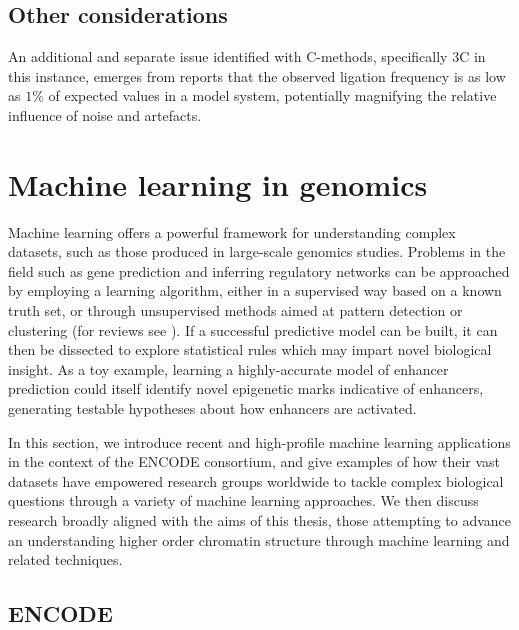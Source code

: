 \documentclass[a4paper,11pt,oneside]{book}
\begin{document}
\subsection{Other considerations}
An additional and separate issue identified with C-methods, specifically 3C in this instance, emerges from reports that the observed ligation frequency is as low as $1\%$ of expected values in a model system,\cite{Gavrilov2013} potentially magnifying the relative influence of noise and artefacts.



\section{Machine learning in genomics}\label{intro:ml}

Machine learning offers a powerful framework for understanding complex datasets, such as those produced in large-scale genomics studies. Problems in the field such as gene prediction and inferring regulatory networks can be approached by employing a learning algorithm, either in a supervised way based on a known truth set, or through unsupervised methods aimed at pattern detection or clustering (for reviews see ). If a successful predictive model can be built, it can then be dissected to explore statistical rules which may impart novel biological insight. As a toy example, learning a highly-accurate model of enhancer prediction could itself identify novel epigenetic marks indicative of enhancers, generating testable hypotheses about how enhancers are activated.

In this section, we introduce recent and high-profile machine learning applications in the context of the ENCODE consortium, and give examples of how their vast datasets have empowered research groups worldwide to tackle complex biological questions through a variety of machine learning approaches. We then discuss research broadly aligned with the aims of this thesis, those attempting to advance an understanding higher order chromatin structure through machine learning and related techniques.

\subsection{ENCODE}\label{intro:encode}
\end{document}
